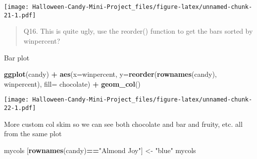\documentclass[
]{article}
\newenvironment{Shaded}{\begin{snugshade}}{\end{snugshade}}
\newcommand{\AttributeTok}[1]{\textcolor[rgb]{0.13,0.29,0.53}{#1}}
\newcommand{\CommentTok}[1]{\textcolor[rgb]{0.56,0.35,0.01}{\textit{#1}}}
\newcommand{\FunctionTok}[1]{\textcolor[rgb]{0.13,0.29,0.53}{\textbf{#1}}}
\newcommand{\NormalTok}[1]{#1}
\newcommand{\OtherTok}[1]{\textcolor[rgb]{0.56,0.35,0.01}{#1}}
\newcommand{\SpecialCharTok}[1]{\textcolor[rgb]{0.81,0.36,0.00}{\textbf{#1}}}
\newcommand{\StringTok}[1]{\textcolor[rgb]{0.31,0.60,0.02}{#1}}
\begin{document}
\texttt{[image: Halloween-Candy-Mini-Project\_files/figure-latex/unnamed-chunk-21-1.pdf]}

\begin{quote}
Q16. This is quite ugly, use the reorder() function to get the bars
sorted by winpercent?
\end{quote}

Bar plot

\begin{Shaded}
\begin{Highlighting}[]
\FunctionTok{ggplot}\NormalTok{(candy) }\SpecialCharTok{+}
  \FunctionTok{aes}\NormalTok{(}\AttributeTok{x=}\NormalTok{winpercent, }
      \AttributeTok{y=}\FunctionTok{reorder}\NormalTok{(}\FunctionTok{rownames}\NormalTok{(candy), winpercent),}
      \AttributeTok{fill=}\NormalTok{ chocolate) }\SpecialCharTok{+}
  \FunctionTok{geom\_col}\NormalTok{()}
\end{Highlighting}
\end{Shaded}

\texttt{[image: Halloween-Candy-Mini-Project\_files/figure-latex/unnamed-chunk-22-1.pdf]}

More custom col skim so we can see both chocolate and bar and fruity,
etc. all from the same plot

\begin{Shaded}
\end{Shaded}

\begin{Shaded}
\begin{Highlighting}[]
\NormalTok{mycols [}\FunctionTok{rownames}\NormalTok{(candy)}\SpecialCharTok{==}\StringTok{"Almond Joy"}\NormalTok{] }\OtherTok{\textless{}{-}} \StringTok{"blue"}
\NormalTok{mycols}
\end{Highlighting}
\end{Shaded}
\end{document}
